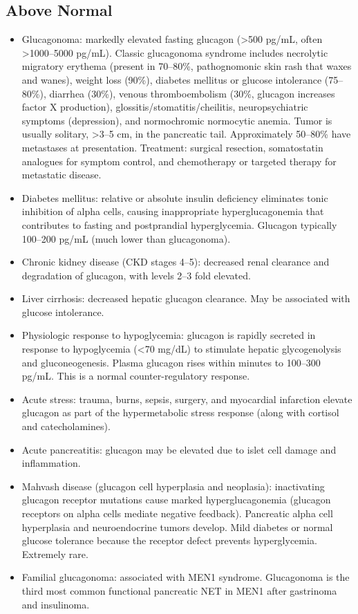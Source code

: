 \subsection*{Above Normal}
\begin{itemize}
  \item Glucagonoma: markedly elevated fasting glucagon (>500 pg/mL, often >1000--5000 pg/mL). Classic glucagonoma syndrome includes necrolytic migratory erythema (present in 70--80\%, pathognomonic skin rash that waxes and wanes), weight loss (90\%), diabetes mellitus or glucose intolerance (75--80\%), diarrhea (30\%), venous thromboembolism (30\%, glucagon increases factor X production), glossitis/stomatitis/cheilitis, neuropsychiatric symptoms (depression), and normochromic normocytic anemia. Tumor is usually solitary, >3--5 cm, in the pancreatic tail. Approximately 50--80\% have metastases at presentation. Treatment: surgical resection, somatostatin analogues for symptom control, and chemotherapy or targeted therapy for metastatic disease.
  \item Diabetes mellitus: relative or absolute insulin deficiency eliminates tonic inhibition of alpha cells, causing inappropriate hyperglucagonemia that contributes to fasting and postprandial hyperglycemia. Glucagon typically 100--200 pg/mL (much lower than glucagonoma).
  \item Chronic kidney disease (CKD stages 4--5): decreased renal clearance and degradation of glucagon, with levels 2--3 fold elevated.
  \item Liver cirrhosis: decreased hepatic glucagon clearance. May be associated with glucose intolerance.
  \item Physiologic response to hypoglycemia: glucagon is rapidly secreted in response to hypoglycemia (<70 mg/dL) to stimulate hepatic glycogenolysis and gluconeogenesis. Plasma glucagon rises within minutes to 100--300 pg/mL. This is a normal counter-regulatory response.
  \item Acute stress: trauma, burns, sepsis, surgery, and myocardial infarction elevate glucagon as part of the hypermetabolic stress response (along with cortisol and catecholamines).
  \item Acute pancreatitis: glucagon may be elevated due to islet cell damage and inflammation.
  \item Mahvash disease (glucagon cell hyperplasia and neoplasia): inactivating glucagon receptor mutations cause marked hyperglucagonemia (glucagon receptors on alpha cells mediate negative feedback). Pancreatic alpha cell hyperplasia and neuroendocrine tumors develop. Mild diabetes or normal glucose tolerance because the receptor defect prevents hyperglycemia. Extremely rare.
  \item Familial glucagonoma: associated with MEN1 syndrome. Glucagonoma is the third most common functional pancreatic NET in MEN1 after gastrinoma and insulinoma.
\end{itemize}

